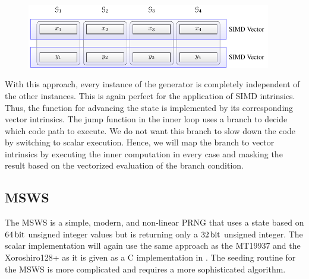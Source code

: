 \documentclass{stdlocal}
\begin{document}

    \begin{figure}
      \center
      \includegraphics[width=0.95\textwidth]{figures/xrsr128p_vector_layout.pdf}
      \caption[Xoroshiro128+ Vector Layout]{}
      \label{fig:xoroshiro-vector-layout}
    \end{figure}

    With this approach, every instance of the generator is completely independent of the other instances.
    This is again perfect for the application of SIMD intrinsics.
    Thus, the function for advancing the state is implemented by its corresponding vector intrinsics.
    The jump function in the inner loop uses a branch to decide which code path to execute.
    We do not want this branch to slow down the code by switching to scalar execution.
    Hence, we will map the branch to vector intrinsics by executing the inner computation in every case and masking the result based on the vectorized evaluation of the branch condition.


  \subsection{MSWS} %
  \label{sub:middle_square_weyl_generator}
    The MSWS is a simple, modern, and non-linear PRNG that uses a state based on $64\, \mathrm{bit}$ unsigned integer values but is returning only a $32\, \mathrm{bit}$ unsigned integer.
    The scalar implementation will again use the same approach as the MT19937 and the Xoroshiro128+ as it is given as a C implementation in \textcite{widynski2019}.
    The seeding routine for the MSWS is more complicated and requires a more sophisticated algorithm.
\end{document}
